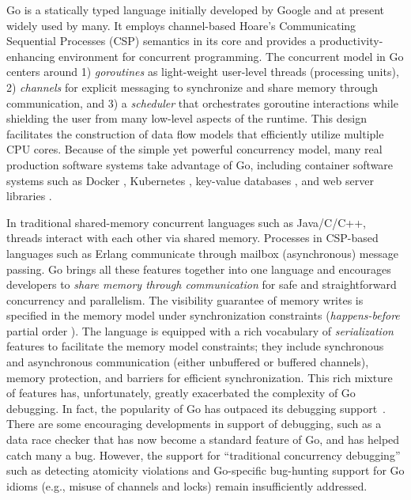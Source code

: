 Go \cite{go} is a statically typed language initially developed by Google and at present widely used by many.
%
It employs channel-based Hoare's Communicating Sequential Processes (CSP) \cite{hoare-csp78} semantics in its core and provides a productivity-enhancing environment for concurrent programming.
%
The concurrent model in Go centers around
1) \textit{goroutines} as light-weight user-level threads (processing units),
2) \textit{channels} for explicit messaging to synchronize and share memory through communication, and
3) a \textit{scheduler} that orchestrates goroutine interactions while shielding
the user from
many low-level
aspects of the runtime.
%
This design
facilitates the
construction
of data flow models that efficiently utilize multiple CPU cores.
%
Because of the simple yet powerful concurrency model, many real production software systems take advantage of Go,
including
container software systems such as Docker \cite{merkel2014docker}, Kubernetes \cite{kubernetes},  key-value databases \cite{etcd}, and web server libraries \cite{grpc}.
%


In traditional shared-memory concurrent languages such as Java/C/C++, threads interact with each other via shared memory.
%
Processes in CSP-based languages such as Erlang communicate through mailbox (asynchronous) message passing.
%
Go brings all these features together into one language and encourages developers to \textit{share memory through communication} for safe and straightforward concurrency and parallelism.
%
The visibility guarantee of memory writes is specified in the memory model\cite{go-memModel} under synchronization constraints (\textit{happens-before} partial order \cite{lamport-hb-1978}).
%
The language is equipped with a rich vocabulary of \textit{serialization} features to facilitate the memory model constraints; they include synchronous and asynchronous communication (either unbuffered or buffered channels), memory protection, and barriers for efficient synchronization.
%
This rich mixture of features has, unfortunately, greatly exacerbated the complexity of Go debugging.
%
In fact, the popularity of Go has outpaced its debugging support~\cite{go-survey,tu-concurrentBugs-asplos19,yuan-gobench-cgo21}.
%
There are some encouraging developments in support of debugging, such as a data race checker \cite{go-race-blog} that has now become a standard feature of Go, and has helped catch many a bug.
%
However, the support for ``traditional concurrency debugging'' such as detecting atomicity violations and Go-specific bug-hunting support for Go idioms (e.g., misuse of channels and locks) remain insufficiently addressed.
%


